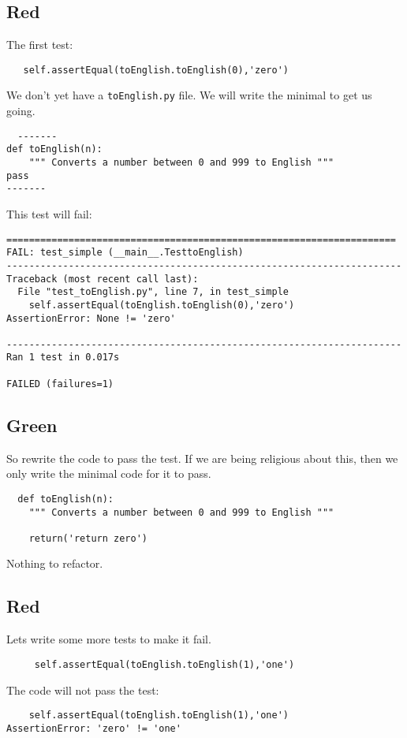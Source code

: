\documentclass{paper}
\begin{document}
\subsection{Red}
The first test:
\begin{lstlisting}
   self.assertEqual(toEnglish.toEnglish(0),'zero')
\end{lstlisting}
We don't yet have a {\tt toEnglish.py} file. We will write the minimal
to get us going.
\begin{lstlisting}
  -------
def toEnglish(n):
    """ Converts a number between 0 and 999 to English """
pass
------- 
\end{lstlisting}
This test will fail:
\begin{verbatim}
=====================================================================
FAIL: test_simple (__main__.TesttoEnglish)
----------------------------------------------------------------------
Traceback (most recent call last):
  File "test_toEnglish.py", line 7, in test_simple
    self.assertEqual(toEnglish.toEnglish(0),'zero')
AssertionError: None != 'zero'

----------------------------------------------------------------------
Ran 1 test in 0.017s

FAILED (failures=1)
\end{verbatim}

\subsection{Green}
So rewrite the code to pass the test. If we are being religious about
this, then we only write the minimal code for it to pass.

\begin{lstlisting}
  def toEnglish(n):
    """ Converts a number between 0 and 999 to English """

    return('return zero')
\end{lstlisting}
Nothing to refactor. 
\subsection{Red}
Lets write some more tests to make it fail.
\begin{lstlisting}
     self.assertEqual(toEnglish.toEnglish(1),'one')
\end{lstlisting}
The code will not pass the test:
\begin{verbatim}
    self.assertEqual(toEnglish.toEnglish(1),'one')
AssertionError: 'zero' != 'one'
\end{verbatim}
\end{document}
